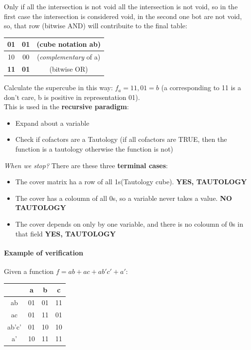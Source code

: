 	Only if all the intersection is not void all the intersection is not void, so in the first case the intersection is considered void, in the second one bot are not void, so, that row (bitwise AND) will contribuite to the final table:\\ 
	
\begin{center}
		\begin{tabular}{c | c | c}
		01 & 01 & (cube notation ab) \\ \hline
		10 & 00 & (\textit{complementary} of a)\\ \hline 
		\textbf{11} & \textbf{01} & (bitwise OR) \\
	\end{tabular}
\end{center}
	
Calculate the supercube in this way: $f_{a} = 11,01 = b$ (a corresponding to 11 is a don't care, b is positive in representation 01).\\

This is used in the \textbf{recursive paradigm}:

\begin{itemize}
	\item Expand about a variable
	\item Check if cofactors are a Tautology (if all cofactors are TRUE, then the function is a tautology otherwise the function is not)
\end{itemize}

\textit{When we stop?} There are these three \textbf{terminal cases}:
\\
\begin{itemize}
	\item The cover matrix ha a row of all 1s(Tautology cube). \textbf{YES, TAUTOLOGY}
	\item The cover has a coloumn of all 0s, so a variable never takes a value. \textbf{NO TAUTOLOGY}
	\item The cover depends on only by one variable, and there is no coloumn of 0s in that field \textbf{YES, TAUTOLOGY}
\end{itemize}

\paragraph{Example of verification} Given a function $f= ab+ac+ab'c'+a'$:

\begin{center}
	\begin{tabular}{c || c | c | c}
	{} & a & b & c \\ \hline \hline
	ab & 01 & 01 & 11\\ \hline
	ac & 01 & 11 & 01\\ \hline 
	ab'c' & 01 & 10 & 10 \\ \hline
	a' & 10 & 11 & 11
\end{tabular}
\end{center}

